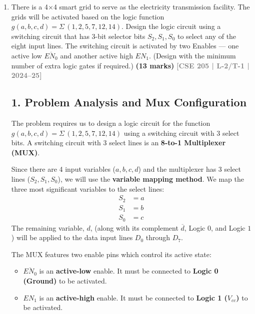 \documentclass[12pt,a3paper]{article}
\newcommand{\yr}[1]{\hfill\textcolor{gray}{\small\textbf{[#1]}}}
\newcommand{\mk}[1]{\textcolor{orange!70!black}{\small\textbf{(#1 marks)}}}
\begin{document}
\begin{enumerate}


\item There is a 4$\times$4 smart grid to serve as the electricity transmission facility. The grids will be activated based on the logic function $g(a,b,c,d) = \Sigma\,(1,2,5,7,12,14)$. Design the logic circuit using a switching circuit that has 3-bit selector bits $S_2, S_1, S_0$ to select any of the eight input lines. The switching circuit is activated by two Enables — one active low $\overline{EN_0}$ and another active high $EN_1$. (Design with the minimum number of extra logic gates if required.)
\mk{13} \yr{CSE 205 | L-2/T-1 | 2024--25}

\begin{tcolorbox}[enhanced,breakable,ansbox,colback=cD!4,colframe=cD,boxrule=0.8pt,arc=5pt,title={\textbf{Answer}},fonttitle=\bfseries\color{white},colbacktitle=cD]

\subsection*{1. Problem Analysis and Mux Configuration}
The problem requires us to design a logic circuit for the function $g(a,b,c,d) = \Sigma\,(1,2,5,7,12,14)$ using a switching circuit with 3 select bits. A switching circuit with 3 select lines is an \textbf{8-to-1 Multiplexer (MUX)}.

Since there are 4 input variables ($a, b, c, d$) and the multiplexer has 3 select lines ($S_2, S_1, S_0$), we will use the \textbf{variable mapping method}. We map the three most significant variables to the select lines:
\begin{align*}
    S_2 &= a \\
    S_1 &= b \\
    S_0 &= c
\end{align*}
The remaining variable, $d$, (along with its complement $\overline{d}$, Logic $0$, and Logic $1$) will be applied to the data input lines $D_0$ through $D_7$.

The MUX features two enable pins which control its active state:
\begin{itemize}
    \item $\overline{EN_0}$ is an \textbf{active-low} enable. It must be connected to \textbf{Logic 0 (Ground)} to be activated.
    \item $EN_1$ is an \textbf{active-high} enable. It must be connected to \textbf{Logic 1 ($V_{cc}$)} to be activated.
\end{itemize}


\end{tcolorbox}
\end{enumerate}
\end{document}
